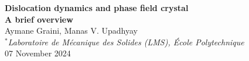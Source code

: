 \documentclass[11pt]{article}
\begin{document}
\begin{center}
    \LARGE\textbf{Dislocation dynamics and phase field crystal \\ A brief overview}
    \\
    \vspace{0.5cm}
    \normalsize
    Aymane Graini,  Manas V. Upadhyay \\
    \vspace{0.5cm}
    $^*$\textit{Laboratoire de Mécanique des Solides (LMS), École Polytechnique}\\
    07 November 2024 \\\vspace{0.5cm}
\end{center}
\normalsize
\tableofcontents
\newpage

\newpage

\newpage



\clearpage
\printbibliography[heading=bibintoc,title={Bibliography}]
\end{document}

